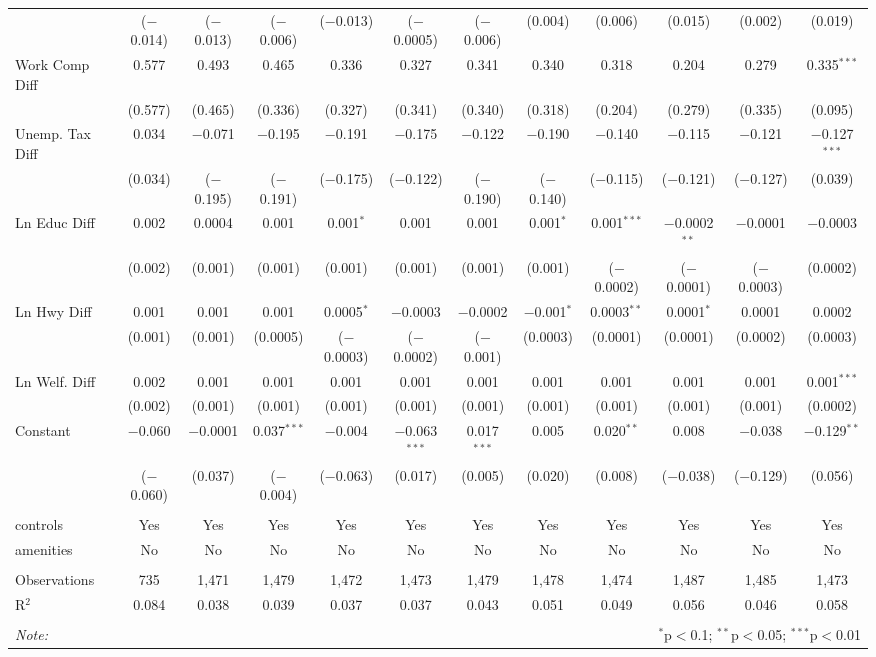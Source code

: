 \begin{table}[!htbp]
\begin{tabular}{@{\extracolsep{5pt}}lccccccccccc}
  & ($-$0.014) & ($-$0.013) & ($-$0.006) & ($-$0.013) & ($-$0.0005) & ($-$0.006) & (0.004) & (0.006) & (0.015) & (0.002) & (0.019) \\ 
  Work Comp Diff & 0.577 & 0.493 & 0.465 & 0.336 & 0.327 & 0.341 & 0.340 & 0.318 & 0.204 & 0.279 & 0.335$^{***}$ \\ 
  & (0.577) & (0.465) & (0.336) & (0.327) & (0.341) & (0.340) & (0.318) & (0.204) & (0.279) & (0.335) & (0.095) \\ 
  Unemp. Tax Diff & 0.034 & $-$0.071 & $-$0.195 & $-$0.191 & $-$0.175 & $-$0.122 & $-$0.190 & $-$0.140 & $-$0.115 & $-$0.121 & $-$0.127$^{***}$ \\ 
  & (0.034) & ($-$0.195) & ($-$0.191) & ($-$0.175) & ($-$0.122) & ($-$0.190) & ($-$0.140) & ($-$0.115) & ($-$0.121) & ($-$0.127) & (0.039) \\ 
  Ln Educ Diff & 0.002 & 0.0004 & 0.001 & 0.001$^{*}$ & 0.001 & 0.001 & 0.001$^{*}$ & 0.001$^{***}$ & $-$0.0002$^{**}$ & $-$0.0001 & $-$0.0003 \\ 
  & (0.002) & (0.001) & (0.001) & (0.001) & (0.001) & (0.001) & (0.001) & ($-$0.0002) & ($-$0.0001) & ($-$0.0003) & (0.0002) \\ 
  Ln Hwy Diff & 0.001 & 0.001 & 0.001 & 0.0005$^{*}$ & $-$0.0003 & $-$0.0002 & $-$0.001$^{*}$ & 0.0003$^{**}$ & 0.0001$^{*}$ & 0.0001 & 0.0002 \\ 
  & (0.001) & (0.001) & (0.0005) & ($-$0.0003) & ($-$0.0002) & ($-$0.001) & (0.0003) & (0.0001) & (0.0001) & (0.0002) & (0.0003) \\ 
  Ln Welf. Diff & 0.002 & 0.001 & 0.001 & 0.001 & 0.001 & 0.001 & 0.001 & 0.001 & 0.001 & 0.001 & 0.001$^{***}$ \\ 
  & (0.002) & (0.001) & (0.001) & (0.001) & (0.001) & (0.001) & (0.001) & (0.001) & (0.001) & (0.001) & (0.0002) \\ 
  Constant & $-$0.060 & $-$0.0001 & 0.037$^{***}$ & $-$0.004 & $-$0.063$^{***}$ & 0.017$^{***}$ & 0.005 & 0.020$^{**}$ & 0.008 & $-$0.038 & $-$0.129$^{**}$ \\ 
  & ($-$0.060) & (0.037) & ($-$0.004) & ($-$0.063) & (0.017) & (0.005) & (0.020) & (0.008) & ($-$0.038) & ($-$0.129) & (0.056) \\ 
 \hline \\[-1.8ex] 
controls & Yes & Yes & Yes & Yes & Yes & Yes & Yes & Yes & Yes & Yes & Yes \\ 
amenities & No & No & No & No & No & No & No & No & No & No & No \\ 
\hline \\[-1.8ex] 
Observations & 735 & 1,471 & 1,479 & 1,472 & 1,473 & 1,479 & 1,478 & 1,474 & 1,487 & 1,485 & 1,473 \\ 
R$^{2}$ & 0.084 & 0.038 & 0.039 & 0.037 & 0.037 & 0.043 & 0.051 & 0.049 & 0.056 & 0.046 & 0.058 \\ 
\hline 
\hline \\[-1.8ex] 
\textit{Note:}  & \multicolumn{11}{r}{$^{*}$p$<$0.1; $^{**}$p$<$0.05; $^{***}$p$<$0.01} \\ 
\end{tabular} 
\end{table} 
